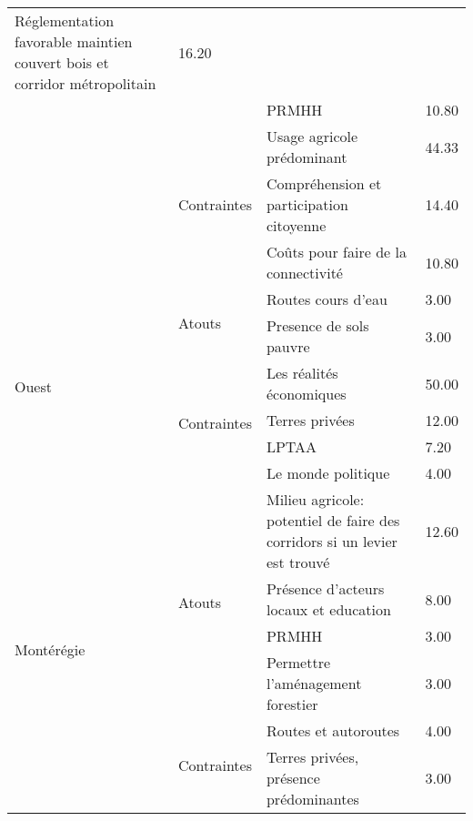 \begin{table}[h!]
\begin{tabular}{m{}lm{}l}
  Réglementation favorable maintien couvert bois et corridor métropolitain &
  16.20 \\ \cline{3-4} 
                       &                              & PRMHH                                               & 10.80 \\ \cline{2-4} 
                       & \multirow{3}{*}{Contraintes} & Usage agricole prédominant                          & 44.33 \\ \cline{3-4} 
                       &                              & Compréhension et participation citoyenne            & 14.40 \\ \cline{3-4} 
                       &                              & Coûts pour faire de la connectivité                 & 10.80 \\ \hline
\multirow{6}{*}{Ouest} & \multirow{2}{*}{Atouts}      & Routes cours d'eau                                  & 3.00  \\ \cline{3-4} 
                       &                              & Presence de sols pauvre                             & 3.00  \\ \cline{2-4} 
                       & \multirow{4}{*}{Contraintes} & Les réalités économiques                            & 50.00 \\ \cline{3-4} 
                       &                              & Terres privées                                      & 12.00 \\ \cline{3-4} 
                       &                              & LPTAA                                               & 7.20  \\ \cline{3-4} 
                       &                              & Le monde politique                                  & 4.00  \\ \hline
\multirow{6}{*}{Montérégie} &
  \multirow{4}{*}{Atouts} &
  Milieu agricole: potentiel de faire des corridors si un levier est trouvé &
  12.60 \\ \cline{3-4} 
                       &                              & Présence d'acteurs locaux et education              & 8.00  \\ \cline{3-4} 
                       &                              & PRMHH                                               & 3.00  \\ \cline{3-4} 
                       &                              & Permettre l'aménagement forestier                   & 3.00  \\ \cline{2-4} 
                       & \multirow{2}{*}{Contraintes} & Routes et autoroutes                                & 4.00  \\ \cline{3-4} 
                       &                              & Terres privées, présence prédominantes              & 3.00  \\ \hline
\end{tabular}
\end{table}

